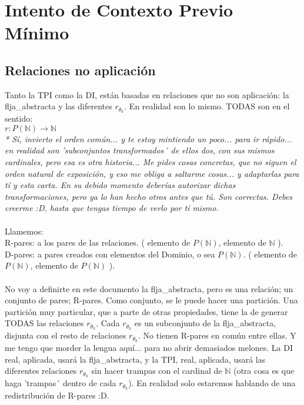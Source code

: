 \chapter{Intento de Contexto Previo Mínimo}

	\section{Relaciones no aplicación}

	\noindent
	Tanto la TPI como la DI, están basadas en relaciones que no son aplicación: la flja\_abstracta y las diferentes $r_{\theta_{k}}$. En realidad son lo mismo. TODAS son en el sentido:\\
	$r: P(\mathbb{N}) \rightarrow \mathbb{N}$\\
	\textit{* Sí, invierto el orden común... y te estoy mintiendo un poco... para ir rápido... en realidad son 'subconjuntos transformados´ de ellos dos, con sus mismos cardinales, pero esa es otra historia... Me pides cosas concretas, que no siguen el orden natural de exposición, y eso me obliga a saltarme cosas... y adaptarlas para tí y esta carta. En su debido momento deberías autorizar dichas transformaciones, pero ya lo han hecho otros antes que tú. Son correctas. Debes creerme :D, hasta que tengas tiempo de verlo por tí mismo.}
	\\\\
	
	\noindent
	Llamemos:\\
	R-pares: a los pares de las relaciones. ( elemento de $P(\mathbb{N})$, elemento de $\mathbb{N}$ ).\\
	D-pares: a pares creados con elementos del Dominio, o sea $P(\mathbb{N})$. ( elemento de $P(\mathbb{N})$, elemento de $P(\mathbb{N})$ ).
	\\\\
	
	\noindent
	No voy a definirte en este documento la flja\_abstracta, pero es una relación; un conjunto de pares; R-pares. Como conjunto, se le puede hacer una partición. Una partición muy particular, que a parte de otras propiedades, tiene la de generar TODAS las relaciones $r_{\theta_{k}}$. Cada $r_{\theta_{k}}$ es un subconjunto de la flja\_abstracta, disjunta con el resto de relaciones $r_{\theta_{k}}$. No tienen R-pares en común entre ellas. Y me tengo que morder la lengua aquí... para no abrir demasiados melones. La DI real, aplicada, usará la flja\_abstracta, y la TPI, real, aplicada, usará las diferentes relaciones $r_{\theta_{k}}$ sin hacer trampas con el cardinal de $\mathbb{N}$ (otra cosa es que haga 'trampas´ dentro de cada $r_{\theta_{k}}$). En realidad solo estaremos hablando de una redistribución de R-pares :D.
	\\\\
	
